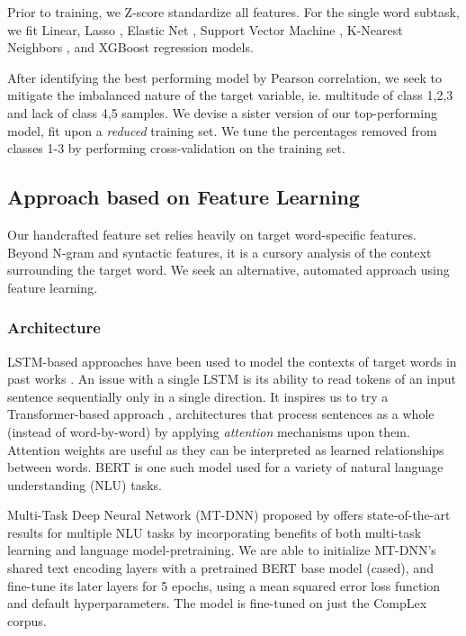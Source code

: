 \documentclass[11pt,a4paper]{article}
\begin{document}
Prior to training, we Z-score standardize all features. For the single word subtask, we fit Linear, Lasso \citep{tibshirani96regression}, Elastic Net \citep{10.2307/3647580}, Support Vector Machine \citep{Platt99probabilisticoutputs}, K-Nearest Neighbors \citep{wiki:K-nearest_neighbors_algorithm}, and XGBoost \citep{DBLP:journals/corr/ChenG16} regression models. 

After identifying the best performing model by Pearson correlation, we seek to mitigate the imbalanced nature of the target variable, ie. multitude of class 1,2,3 and lack of class 4,5 samples. We devise a sister version of our top-performing model, fit upon a \textit{reduced} training set. We tune the percentages removed from classes 1-3 by performing cross-validation on the training set.

\subsection{Approach based on Feature Learning}

Our handcrafted feature set relies heavily on target word-specific features. Beyond N-gram and syntactic features, it is a cursory analysis of the context surrounding the target word. We seek an alternative, automated approach using feature learning.

\subsubsection{Architecture}

LSTM-based approaches have been used to model the contexts of target words in past works \citep{hartmanndossantos2018nilc, dehertogtack2018deep}. An issue with a single LSTM is its ability to read tokens of an input sentence sequentially only in a single direction. It inspires us to try a Transformer-based approach \citep{DBLP:journals/corr/VaswaniSPUJGKP17}, architectures that process sentences as a whole (instead of word-by-word) by applying \textit{attention} mechanisms upon them. Attention weights are useful as they can be interpreted as learned relationships between words. BERT \citep{DBLP:journals/corr/abs-1810-04805} is one such model used for a variety of natural language understanding (NLU) tasks.

Multi-Task Deep Neural Network (MT-DNN) proposed by \citet{liuetal2019multitask} offers state-of-the-art results for multiple NLU tasks by incorporating benefits of both multi-task learning and language model-pretraining. We are able to initialize MT-DNN's shared text encoding layers with a pretrained BERT base model (cased), and fine-tune its later layers for 5 epochs, using a mean squared error loss function and default hyperparameters. The model is fine-tuned on just the CompLex corpus.
\end{document}
